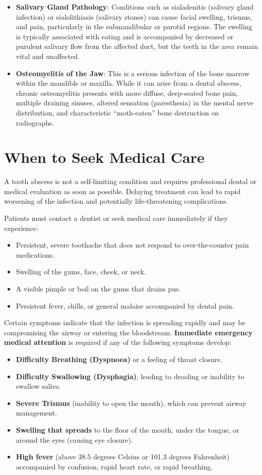 \begin{itemize}
  \item \textbf{Salivary Gland Pathology}: Conditions such as sialadenitis (salivary gland infection) or sialolithiasis (salivary stones) can cause facial swelling, trismus, and pain, particularly in the submandibular or parotid regions. The swelling is typically associated with eating and is accompanied by decreased or purulent salivary flow from the affected duct, but the teeth in the area remain vital and unaffected.
  \item \textbf{Osteomyelitis of the Jaw}: This is a serious infection of the bone marrow within the mandible or maxilla. While it can arise from a dental abscess, chronic osteomyelitis presents with more diffuse, deep-seated bone pain, multiple draining sinuses, altered sensation (paresthesia) in the mental nerve distribution, and characteristic ``moth-eaten'' bone destruction on radiographs.
\end{itemize}

\section*{When to Seek Medical Care}
A tooth abscess is not a self-limiting condition and requires professional dental or medical evaluation as soon as possible. Delaying treatment can lead to rapid worsening of the infection and potentially life-threatening complications.

Patients must contact a dentist or seek medical care immediately if they experience:
\begin{itemize}
  \item Persistent, severe toothache that does not respond to over-the-counter pain medications.
  \item Swelling of the gums, face, cheek, or neck.
  \item A visible pimple or boil on the gums that drains pus.
  \item Persistent fever, chills, or general malaise accompanied by dental pain.
\end{itemize}

Certain symptoms indicate that the infection is spreading rapidly and may be compromising the airway or entering the bloodstream. \textbf{Immediate emergency medical attention} is required if any of the following symptoms develop:
\begin{itemize}
  \item \textbf{Difficulty Breathing (Dyspnoea)} or a feeling of throat closure.
  \item \textbf{Difficulty Swallowing (Dysphagia)}, leading to drooling or inability to swallow saliva.
  \item \textbf{Severe Trismus} (inability to open the mouth), which can prevent airway management.
  \item \textbf{Swelling that spreads} to the floor of the mouth, under the tongue, or around the eyes (causing eye closure).
  \item \textbf{High fever} (above 38.5 degrees Celsius or 101.3 degrees Fahrenheit) accompanied by confusion, rapid heart rate, or rapid breathing.
\end{itemize}

